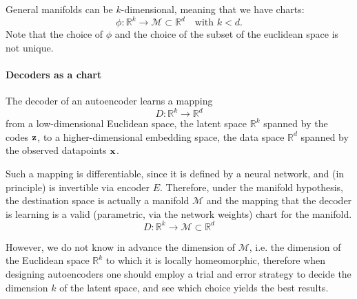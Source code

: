 General manifolds can be $k$-dimensional, meaning that we have charts:
\begin{equation}
	\phi: \mathbb{R}^k \to \mathcal{M} \subset \mathbb{R}^d \quad \text{with } k < d.
\end{equation}
Note that the choice of $\phi$ and the choice of the subset of the euclidean space is not unique.

\paragraph{Decoders as a chart}

The decoder of an autoencoder learns a mapping 
\begin{equation}
    D: \mathbb{R}^k \to \mathbb{R}^d
\end{equation}
from a low-dimensional Euclidean space, the latent space $\mathbb{R}^k$ spanned by the codes $\vb{z}$, to a higher-dimensional embedding space, the data space $\mathbb{R}^d$ spanned by the observed datapoints $\vb{x}$. 

Such a mapping is differentiable, since it is defined by a neural network, and (in principle) is invertible via encoder $E$. Therefore, under the manifold hypothesis, the destination space is actually a manifold $\mathcal{M}$ and the mapping that the decoder is learning is a valid (parametric, via the network weights) chart for the manifold.
\begin{equation}
    D: \mathbb{R}^k \to \mathcal{M} \subset \mathbb{R}^d
\end{equation}

However, we do not know in advance the dimension of $\mathcal{M}$, i.e. the dimension of the Euclidean space $\mathbb{R}^k$ to which it is locally homeomorphic, therefore when designing autoencoders one should employ a trial and error strategy to decide the dimension $k$ of the latent space, and see which choice yields the best results.

